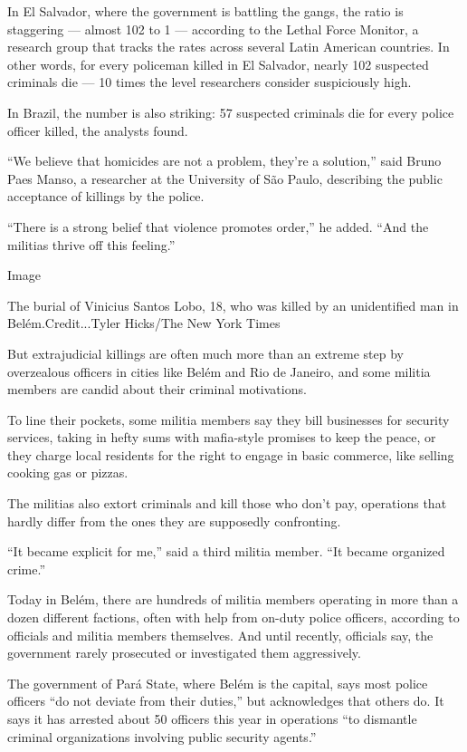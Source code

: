 In El Salvador, where the government is battling the gangs, the ratio is
staggering --- almost 102 to 1 --- according to the Lethal Force
Monitor, a research group that tracks the rates across several Latin
American countries. In other words, for every policeman killed in El
Salvador, nearly 102 suspected criminals die --- 10 times the level
researchers consider suspiciously high.

In Brazil, the number is also striking: 57 suspected criminals die for
every police officer killed, the analysts found.

``We believe that homicides are not a problem, they're a solution,''
said Bruno Paes Manso, a researcher at the University of São Paulo,
describing the public acceptance of killings by the police.

``There is a strong belief that violence promotes order,'' he added.
``And the militias thrive off this feeling.''

Image

The burial of Vinicius Santos Lobo, 18, who was killed by an
unidentified man in Belém.Credit...Tyler Hicks/The New York Times

But extrajudicial killings are often much more than an extreme step by
overzealous officers in cities like Belém and Rio de Janeiro, and some
militia members are candid about their criminal motivations.

To line their pockets, some militia members say they bill businesses for
security services, taking in hefty sums with mafia-style promises to
keep the peace, or they charge local residents for the right to engage
in basic commerce, like selling cooking gas or pizzas.

The militias also extort criminals and kill those who don't pay,
operations that hardly differ from the ones they are supposedly
confronting.

``It became explicit for me,'' said a third militia member. ``It became
organized crime.''

Today in Belém, there are hundreds of militia members operating in more
than a dozen different factions, often with help from on-duty police
officers, according to officials and militia members themselves. And
until recently, officials say, the government rarely prosecuted or
investigated them aggressively.

The government of Pará State, where Belém is the capital, says most
police officers ``do not deviate from their duties,'' but acknowledges
that others do. It says it has arrested about 50 officers this year in
operations ``to dismantle criminal organizations involving public
security agents.''

